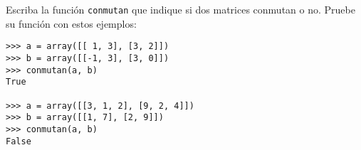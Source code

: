 \begin{enumerate}
  Escriba la función \lstinline!conmutan! que indique si dos matrices
  conmutan o no. Pruebe su función con estos ejemplos:

\begin{lstlisting}
>>> a = array([[ 1, 3], [3, 2]])
>>> b = array([[-1, 3], [3, 0]])
>>> conmutan(a, b)
True

>>> a = array([[3, 1, 2], [9, 2, 4]])
>>> b = array([[1, 7], [2, 9]])
>>> conmutan(a, b)
False
\end{lstlisting}
\end{enumerate}
